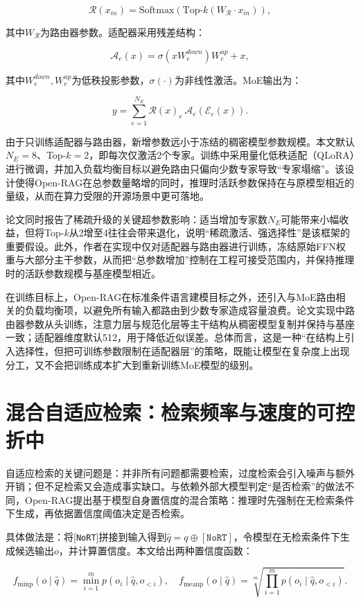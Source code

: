 \[
\mathcal{R}(x_{in})=\mathrm{Softmax}(\mathrm{Top\text{-}}k(W_{\mathcal{R}}\cdot x_{in})),
\]
 
其中$W_{\mathcal{R}}$为路由器参数。适配器采用残差结构：
 
\[
\mathcal{A}_{e}(x)=\sigma(xW_{e}^{down})W_{e}^{up}+x,
\]
 
其中$W_{e}^{down},W_{e}^{up}$为低秩投影参数，$\sigma(\cdot)$为非线性激活。MoE输出为：
 
\[
y=\sum_{e=1}^{N_E}\mathcal{R}(x)_{e}\,\mathcal{A}_{e}(\mathcal{E}_{e}(x)).
\]
 
由于只训练适配器与路由器，新增参数远小于冻结的稠密模型参数规模。本文默认$N_E=8$、Top-$k=2$，即每次仅激活2个专家。训练中采用量化低秩适配（QLoRA）进行微调，并加入负载均衡目标以避免路由只偏向少数专家导致“专家塌缩”。该设计使得Open-RAG在总参数量略增的同时，推理时活跃参数保持在与原模型相近的量级，从而在算力受限的开源场景中更可落地。

论文同时报告了稀疏升级的关键超参数影响：适当增加专家数$N_E$可能带来小幅收益，但将Top-$k$从2增至4往往会带来退化，说明“稀疏激活、强选择性”是该框架的重要假设。此外，作者在实现中仅对适配器与路由器进行训练，冻结原始FFN权重与大部分主干参数，从而把“总参数增加”控制在工程可接受范围内，并保持推理时的活跃参数规模与基座模型相近。

在训练目标上，Open-RAG在标准条件语言建模目标之外，还引入与MoE路由相关的负载均衡项，以避免所有输入都路由到少数专家造成容量浪费。论文实现中路由器参数从头训练，注意力层与规范化层等主干结构从稠密模型复制并保持与基座一致；适配器维度默认512，用于降低近似误差。总体而言，这是一种“在结构上引入选择性，但把可训练参数限制在适配器层”的策略，既能让模型在复杂度上出现分工，又不会把训练成本扩大到重新训练MoE模型的级别。
 
\section{混合自适应检索：检索频率与速度的可控折中}
自适应检索的关键问题是：并非所有问题都需要检索，过度检索会引入噪声与额外开销；但不足检索又会造成事实缺口。与依赖外部大模型判定“是否检索”的做法不同，Open-RAG提出基于模型自身置信度的混合策略：推理时先强制在无检索条件下生成，再依据置信度阈值决定是否检索。
 
具体做法是：将[\texttt{NoRT}]拼接到输入得到$\hat{q}=q\oplus[\texttt{NoRT}]$，令模型在无检索条件下生成候选输出$o$，并计算置信度。本文给出两种置信度函数：
 
\[
f_{\mathrm{minp}}(o\mid\hat{q})=\min_{i=1}^{m}p(o_i\mid\hat{q},o_{<i}),
\quad
f_{\mathrm{meanp}}(o\mid\hat{q})=\sqrt[m]{\prod_{i=1}^{m}p(o_i\mid\hat{q},o_{<i})}.
\]
 
